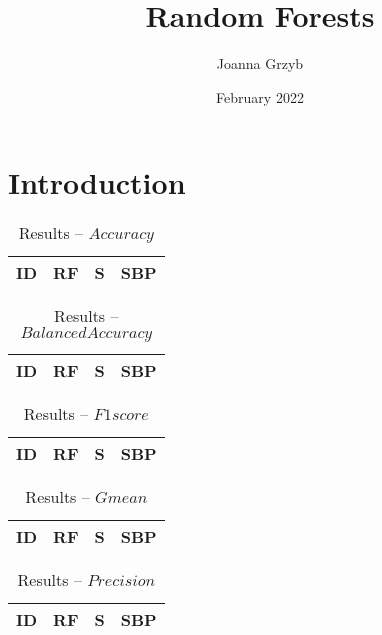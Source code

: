 \documentclass{llncs}
\title{Random Forests}
\author{Joanna Grzyb}
\date{February 2022}
\begin{document}
\maketitle

\section{Introduction}

\begin{table}[!ht]
\centering
\caption{Results -- $Accuracy$}
\begin{tabular}{r c c c}
  \hline
\textbf{ID} & \textbf{RF} & \textbf{S} & \textbf{SBP}\\
    \hline
    
\end{tabular}
\end{table}

\begin{table}[!ht]
\centering
\caption{Results -- $Balanced Accuracy$}
\begin{tabular}{r c c c}
  \hline
\textbf{ID} & \textbf{RF} & \textbf{S} & \textbf{SBP}\\
    \hline
    
\end{tabular}
\end{table}

\begin{table}[!ht]
\centering
\caption{Results -- $F1score$}
\begin{tabular}{r c c c}
  \hline
\textbf{ID} & \textbf{RF} & \textbf{S} & \textbf{SBP}\\
    \hline
    
\end{tabular}
\end{table}

\begin{table}[!ht]
\centering
\caption{Results -- $Gmean$}
\begin{tabular}{r c c c}
  \hline
\textbf{ID} & \textbf{RF} & \textbf{S} & \textbf{SBP}\\
    \hline
    
\end{tabular}
\end{table}

\begin{table}[!ht]
\centering
\caption{Results -- $Precision$}
\begin{tabular}{r c c c}
  \hline
\textbf{ID} & \textbf{RF} & \textbf{S} & \textbf{SBP}\\
    \hline
    
\end{tabular}
\end{table}
\end{document}
